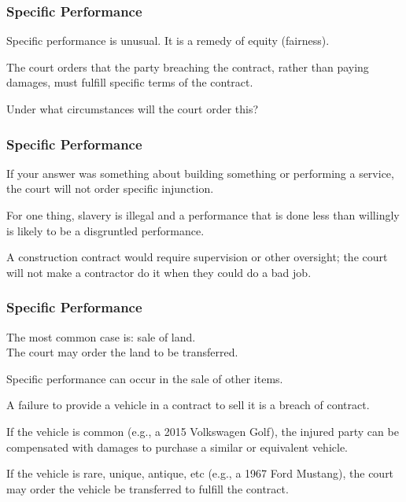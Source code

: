 \begin{frame}
\frametitle{Specific Performance}

Specific performance is unusual. It is a remedy of equity (fairness).

The court orders that the party breaching the contract, rather than paying damages, must fulfill specific terms of the contract.

Under what circumstances will the court order this?

\end{frame}




\begin{frame}
\frametitle{Specific Performance}

If your answer was something about building something or performing a service, the court will not order specific injunction.

For one thing, slavery is illegal and a performance that is done less than willingly is likely to be a disgruntled performance.

A construction contract would require supervision or other oversight; the court will not make a contractor do it when they could do a bad job.

\end{frame}



\begin{frame}
\frametitle{Specific Performance}

The most common case is: sale of land.\\
\quad The court may order the land to be transferred.

Specific performance can occur in the sale of other items.

A failure to provide a vehicle in a contract to sell it is a breach of contract.

If the vehicle is common (e.g., a 2015 Volkswagen Golf), the injured party can be compensated with damages to purchase a similar or equivalent vehicle.

If the vehicle is rare, unique, antique, etc (e.g., a 1967 Ford Mustang), the court may order the vehicle be transferred to fulfill the contract.

\end{frame}



